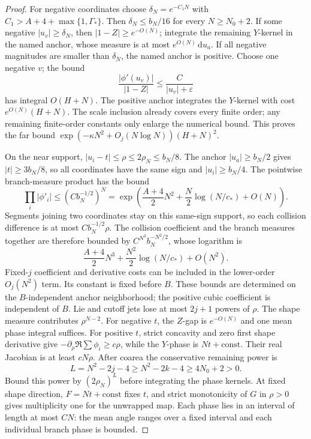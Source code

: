 \documentclass[11pt]{article}
\numberwithin{equation}{section}
\theoremstyle{definition}
\newcommand{\dd}{\,\mathrm d}
\newcommand{\eps}{\varepsilon}
\begin{document}
\begin{proof}
For negative coordinates choose \(\delta_N=e^{-C_1N}\) with
\(C_1>A+4+\max\{1,\Gamma_*\}\). Then \(\delta_N\le b_N/16\)
for every \(N\ge N_0+2\). If some negative \(|u_v|\ge\delta_N\), then
\(|1-Z|\ge e^{-O(N)}\); integrate the remaining \(Y\)-kernel
in the named anchor, whose measure is at most \(e^{O(N)}\dd u_a\).
If all negative magnitudes are smaller than \(\delta_N\), the
named anchor is positive. Choose one negative \(v\); the bound
\[
 \frac{|\phi'(u_v)|}{|1-Z|}\le\frac C{|u_v|+\eps}
\]
has integral \(O(H+N)\). The positive anchor integrates the
\(Y\)-kernel with cost \(e^{O(N)}(H+N)\).
The scale inclusion already covers every finite order; any
remaining finite-order constants only enlarge the numerical bound.
This proves the far bound
\(\exp(-\kappa N^2+O_j(N\log N))(H+N)^2\).

On the near support, \(|u_i-t|\le\rho\le2\rho_N\le b_N/8\).
The anchor \(|u_a|\ge b_N/2\) gives \(|t|\ge3b_N/8\), so
all coordinates have the same sign and \(|u_i|\ge b_N/4\).
The pointwise branch-measure product has the bound
\[
 \prod_i|\phi'_i|\le(Cb_N^{-1/2})^N
 =\exp\left(\frac{A+4}{2}N^2+
             \frac N2\log(N/c_*)+O(N)\right).
\]
Segments joining two coordinates stay on this same-sign support,
so each collision difference is at most \(Cb_N^{-1/2}\rho\).
The collision coefficient and the branch measures together are
therefore bounded by \(C^{N^2}b_N^{-N^2/2}\), whose logarithm is
\[
 \frac{A+4}{2}N^3+\frac{N^2}{2}\log(N/c_*)+O(N^2).
\]
Fixed-\(j\) coefficient and derivative costs can be included in
the lower-order \(O_j(N^2)\) term. Its constant is fixed before
\(B\). These bounds are determined
on the \(B\)-independent anchor neighborhood; the positive cubic
coefficient is independent of \(B\). Lie and cutoff jets lose at most
\(2j+1\) powers of \(\rho\).
The shape measure contributes \(\rho^{N-2}\).
For negative \(t\), the \(Z\)-gap is \(e^{-O(N)}\) and one mean
phase integral suffices.
For positive \(t\), strict concavity and zero first shape derivative
give \(-\partial_\rho\Re\sum\phi_i\ge c\rho\), while the \(Y\)-phase
is \(Nt+\mathrm{const}\). Their real Jacobian is at least \(cN\rho\).
After coarea the conservative remaining power is
\[
 L=N^2-2j-4\ge N^2-2k-4\ge4N_0+2>0.
\]
Bound this power by \((2\rho_N)^L\) before integrating the phase
kernels. At fixed shape direction, \(F=Nt+\mathrm{const}\) fixes
\(t\), and strict monotonicity of \(G\) in \(\rho>0\) gives
multiplicity one for the unwrapped map. Each phase lies in an
interval of length at most \(CN\): the mean angle ranges over a
fixed interval and each individual branch phase is bounded.

\end{proof}
\end{document}
